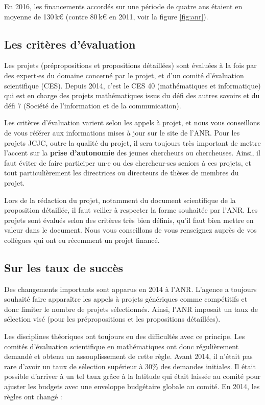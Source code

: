 En 2016, les financements accord\'es sur une p\'eriode de quatre ans \'etaient en moyenne de 130\,k\euro{} (contre 80\,k\euro{} en 2011, voir la figure \ref{fig:anr}).


\subsection*{Les crit\`eres d'\'evaluation}

Les projets (pr\'epropositions et propositions d\'etaill\'ees) sont \'evalu\'ees \`a la fois par des expert$\cdot$es du domaine concern\'e par le projet, et d'un comit\'e d'\'evaluation scientifique (CES). Depuis 2014, c'est le CES 40 (math\'ematiques et informatique) qui est en charge des projets math\'ematiques issus du d\'efi des autres savoirs et du d\'efi 7 (Soci\'et\'e de l'information et de la communication).

Les crit\`eres d'\'evaluation varient selon les appels \`a projet, et nous vous conseillons de vous r\'ef\'erer aux informations mises \`a jour sur le site de l'ANR. Pour les projets JCJC, outre la qualit\'e du projet, il sera toujours tr\`es important de mettre l'accent sur la {\bf prise d'autonomie} des jeunes chercheurs ou chercheuses. Ainsi, il faut \'eviter de faire participer un$\cdot$e ou des chercheur$\cdot$ses seniors \`a ces projets, et tout particuli\`erement les directrices ou directeurs de th\`eses de membres du projet.

Lors de la r\'edaction du projet, notamment du document scientifique de la proposition d\'etaill\'ee, il faut veiller \`a respecter la forme souhait\'ee par l'ANR. Les projets sont \'evalu\'es selon des crit\`eres tr\`es bien d\'efinis, qu'il faut bien mettre en valeur dans le document. Nous vous conseillons de vous renseignez aupr\`es de vos coll\`egues qui ont eu r\'ecemment un projet financ\'e.

\subsection*{Sur les taux de succ\`es}

Des changements importants sont apparus en 2014 \`a l'ANR. L'agence a toujours souhait\'e faire appara\^itre les appels \`a projets g\'en\'eriques comme comp\'etitifs et donc limiter le nombre de projets s\'electionn\'es. Ainsi, l'ANR imposait un taux de s\'election vis\'e (pour les pr\'epropositions et les propositions d\'etaill\'ees).

Les disciplines th\'eoriques ont toujours eu des difficult\'es avec ce principe. Les comit\'es d'\'evaluation scientifique en math\'ematiques ont donc r\'eguli\`erement demand\'e et obtenu un assouplissement de cette r\`egle. Avant 2014, il n'\'etait pas rare d'avoir un taux de s\'election sup\'erieur \`a 30\% des demandes initiales. Il \'etait possible d'arriver \`a un tel taux gr\^ace \`a la latitude qui \'etait laiss\'ee au comit\'e pour ajuster les budgets avec une enveloppe budg\'etaire globale au comit\'e. En 2014, les r\`egles ont chang\'e :

